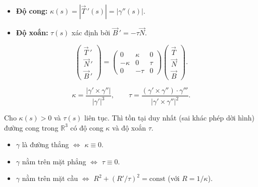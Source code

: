\documentclass[12pt,a4paper]{article}
\begin{document}
\begin{dinhnghia}[title={Độ cong và độ xoắn}]
  \begin{itemize}
    \item \textbf{Độ cong:} $\kappa(s) = |\vec{T}\,'(s)| = |\gamma''(s)|$.
    \item \textbf{Độ xoắn:} $\tau(s)$ xác định bởi $\vec{B}\,' = -\tau \vec{N}$.
  \end{itemize}
\end{dinhnghia}

\begin{congthuc}[title={Công thức Frenet--Serret}]
  \[
    \begin{pmatrix} \vec{T}\,' \\ \vec{N}\,' \\ \vec{B}\,' \end{pmatrix}
    = \begin{pmatrix} 0 & \kappa & 0 \\ -\kappa & 0 & \tau \\ 0 & -\tau & 0 \end{pmatrix}
    \begin{pmatrix} \vec{T} \\ \vec{N} \\ \vec{B} \end{pmatrix}.
  \]
\end{congthuc}

\begin{congthuc}[title={Tính $\kappa$, $\tau$ theo tham số $t$ bất kỳ}]
  \[
    \kappa = \frac{|\gamma' \times \gamma''|}{|\gamma'|^3}, \qquad
    \tau = \frac{(\gamma' \times \gamma'') \cdot \gamma'''}{|\gamma' \times \gamma''|^2}.
  \]
\end{congthuc}

\begin{dinhly}[title={Định lý cơ bản của lý thuyết đường cong}]
  Cho $\kappa(s) > 0$ và $\tau(s)$ liên tục. Thì tồn tại duy nhất (sai khác phép dời hình) đường cong trong $\mathbb{R}^3$ có độ cong $\kappa$ và độ xoắn $\tau$.
\end{dinhly}

\begin{tinhchat}
  \begin{itemize}
    \item $\gamma$ là đường thẳng $\Leftrightarrow$ $\kappa \equiv 0$.
    \item $\gamma$ nằm trên mặt phẳng $\Leftrightarrow$ $\tau \equiv 0$.
    \item $\gamma$ nằm trên mặt cầu $\Leftrightarrow$ $R^2 + (R'/\tau)^2 = \text{const}$ (với $R = 1/\kappa$).
  \end{itemize}
\end{tinhchat}
\end{document}
